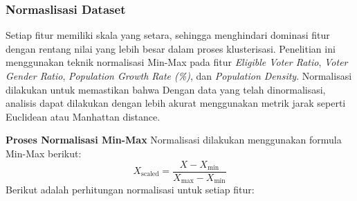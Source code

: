 \subsubsection{Normaslisasi Dataset}
Setiap fitur memiliki skala yang setara, sehingga menghindari dominasi fitur dengan rentang nilai yang lebih besar dalam proses klusterisasi. Penelitian ini menggunakan teknik normalisasi Min-Max pada fitur \textit{Eligible Voter Ratio}, \textit{Voter Gender Ratio}, \textit{Population Growth Rate (\%)}, dan \textit{Population Density}. Normalisasi dilakukan untuk memastikan bahwa  Dengan data yang telah dinormalisasi, analisis dapat dilakukan dengan lebih akurat menggunakan metrik jarak seperti Euclidean atau Manhattan distance.


\textbf{Proses Normalisasi Min-Max} Normalisasi dilakukan menggunakan formula Min-Max berikut:
\[
X_{\text{scaled}} = \frac{X - X_{\text{min}}}{X_{\text{max}} - X_{\text{min}}}
\]
Berikut adalah perhitungan normalisasi untuk setiap fitur:

